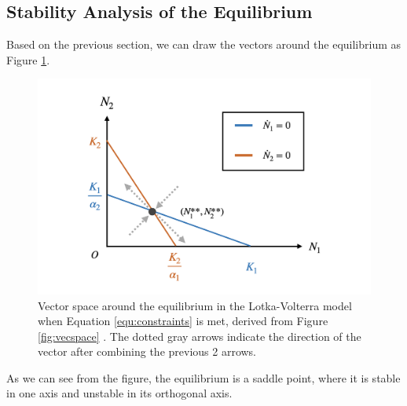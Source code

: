 \subsection{Stability Analysis of the Equilibrium}
Based on the previous section, we can draw the vectors around the equilibrium as Figure \ref{fig:equilibrium_stability}.

\begin{figure}[h]
  \centering
  \includegraphics[width = \textwidth]{fig/graph_003.png}
  \caption {Vector space around the equilibrium in the Lotka-Volterra model when Equation \ref{equ:constraints} is met, derived from Figure \ref{fig:vecspace} . The dotted gray arrows indicate the direction of the vector after combining the previous 2 arrows.}
  \label{fig:equilibrium_stability}
\end{figure}

As we can see from the figure, the equilibrium is a saddle point, where it is stable in one axis and unstable in its orthogonal axis.
